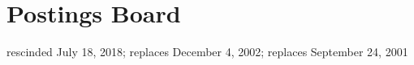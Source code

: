 \section{Postings Board}
rescinded July 18, 2018; replaces December 4, 2002; replaces September 24, 2001
